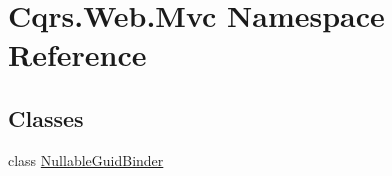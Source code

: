\hypertarget{namespaceCqrs_1_1Web_1_1Mvc}{}\section{Cqrs.\+Web.\+Mvc Namespace Reference}
\label{namespaceCqrs_1_1Web_1_1Mvc}
\subsection*{Classes}
\begin{DoxyCompactItemize}
\item 
class \hyperlink{classCqrs_1_1Web_1_1Mvc_1_1NullableGuidBinder}{Nullable\+Guid\+Binder}
\end{DoxyCompactItemize}
